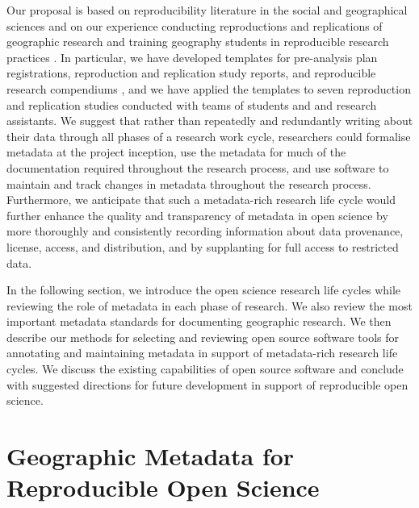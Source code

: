 \documentclass{isprs} %
\begin{document}
Our proposal is based on reproducibility literature in the social and geographical sciences and on our experience conducting reproductions and replications of geographic research and training geography students in reproducible research practices \citep{Kedron_Holler_Bardin_Hilgendorf_2022}.
In particular, we have developed templates for pre-analysis plan registrations, reproduction and replication study reports, and reproducible research compendiums \citep{Kedron_Holler_2022}, and we have applied the templates to seven reproduction and replication studies conducted with teams of students and and research assistants.
We suggest that rather than repeatedly and redundantly writing about their data through all phases of a research work cycle, researchers could formalise metadata at the project inception, use the metadata for much of the documentation required throughout the research process, and use software to maintain and track changes in metadata throughout the research process.
Furthermore, we anticipate that such a metadata-rich research life cycle would further enhance the quality and transparency of metadata in open science by more thoroughly and consistently recording information about data provenance, license, access, and distribution, and by supplanting for full access to restricted data.

In the following section, we introduce the open science research life cycles while reviewing the role of metadata in each phase of research.
We also review the most important metadata standards for documenting geographic research.
We then describe our methods for selecting and reviewing open source software tools for annotating and maintaining metadata in support of metadata-rich research life cycles.
We discuss the existing capabilities of open source software and conclude with suggested directions for future development in support of reproducible open science.

\section{Geographic Metadata for Reproducible Open Science}\label{sec:Background}
\end{document}
